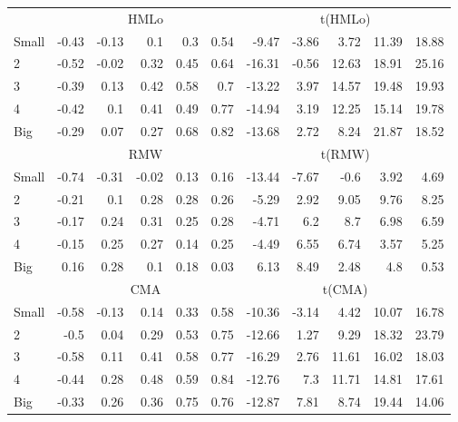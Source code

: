 \begin{table}[!ht]
\begin{tabular}{lrrrrrrrrrr}
  

      & \multicolumn{5}{c}{HMLo} & \multicolumn{5}{c}{t(HMLo)} \\
    \cmidrule(r){2-6} \cmidrule(r){7-11}
      Small  & -0.43  & -0.13  & 0.1  & 0.3  & 0.54   & -9.47  & -3.86  & 3.72  & 11.39  & 18.88  \\
          2  & -0.52  & -0.02  & 0.32  & 0.45  & 0.64   & -16.31  & -0.56  & 12.63  & 18.91  & 25.16  \\
          3  & -0.39  & 0.13  & 0.42  & 0.58  & 0.7   & -13.22  & 3.97  & 14.57  & 19.48  & 19.93  \\
          4  & -0.42  & 0.1  & 0.41  & 0.49  & 0.77   & -14.94  & 3.19  & 12.25  & 15.14  & 19.78  \\
      Big    & -0.29  & 0.07  & 0.27  & 0.68  & 0.82   & -13.68  & 2.72  & 8.24  & 21.87  & 18.52  \\

  

      & \multicolumn{5}{c}{RMW} & \multicolumn{5}{c}{t(RMW)} \\
    \cmidrule(r){2-6} \cmidrule(r){7-11}
      Small  & -0.74  & -0.31  & -0.02  & 0.13  & 0.16   & -13.44  & -7.67  & -0.6  & 3.92  & 4.69  \\
          2  & -0.21  & 0.1  & 0.28  & 0.28  & 0.26   & -5.29  & 2.92  & 9.05  & 9.76  & 8.25  \\
          3  & -0.17  & 0.24  & 0.31  & 0.25  & 0.28   & -4.71  & 6.2  & 8.7  & 6.98  & 6.59  \\
          4  & -0.15  & 0.25  & 0.27  & 0.14  & 0.25   & -4.49  & 6.55  & 6.74  & 3.57  & 5.25  \\
      Big    & 0.16  & 0.28  & 0.1  & 0.18  & 0.03   & 6.13  & 8.49  & 2.48  & 4.8  & 0.53  \\

  

      & \multicolumn{5}{c}{CMA} & \multicolumn{5}{c}{t(CMA)} \\
    \cmidrule(r){2-6} \cmidrule(r){7-11}
      Small  & -0.58  & -0.13  & 0.14  & 0.33  & 0.58   & -10.36  & -3.14  & 4.42  & 10.07  & 16.78  \\
          2  & -0.5  & 0.04  & 0.29  & 0.53  & 0.75   & -12.66  & 1.27  & 9.29  & 18.32  & 23.79  \\
          3  & -0.58  & 0.11  & 0.41  & 0.58  & 0.77   & -16.29  & 2.76  & 11.61  & 16.02  & 18.03  \\
          4  & -0.44  & 0.28  & 0.48  & 0.59  & 0.84   & -12.76  & 7.3  & 11.71  & 14.81  & 17.61  \\
      Big    & -0.33  & 0.26  & 0.36  & 0.75  & 0.76   & -12.87  & 7.81  & 8.74  & 19.44  & 14.06  \\

  

  \bottomrule
\end{tabular}
\label{tbl:25_Size_Value_FF2015}
\end{table}